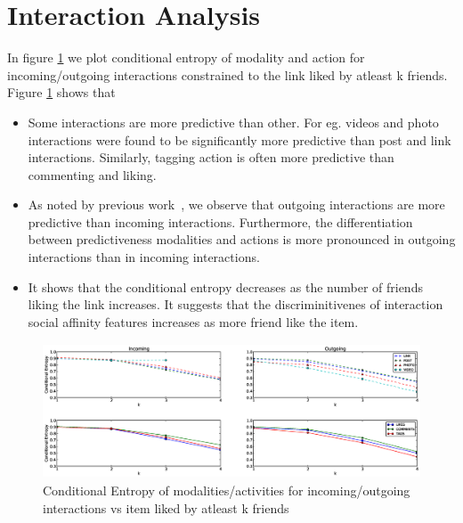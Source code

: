 \section{Interaction Analysis}

In figure \ref{Fig2} we plot conditional entropy of modality and
action for incoming/outgoing interactions constrained to the link
liked by atleast k friends.  Figure \ref{Fig2} shows that
\begin{itemize}
  \item Some interactions are more predictive than other. For
    eg. videos and photo interactions were found to be significantly
    more predictive than post and link interactions. Similarly,
    tagging action is often more predictive than commenting and
    liking.
  \item As noted by previous work~\cite{saez2011high}, we observe that
    outgoing interactions are more predictive than incoming
    interactions. Furthermore, the differentiation between
    predictiveness modalities and actions is more pronounced in
    outgoing interactions than in incoming interactions.
  \item It shows that the conditional entropy decreases as the number
    of friends liking the link increases.  It suggests that the
    discriminitivenes of interaction social affinity features
    increases as more friend like the item.
\end{itemize}


\begin{figure}[tbp!]
\centering
\includegraphics[width=160mm, height=40mm]{data/plots/vsk/ModalityActionsvsKFriends.eps}
\caption{Conditional Entropy  of modalities/activities for incoming/outgoing interactions vs item liked by atleast k friends}
\label{Fig2}
\end{figure}
